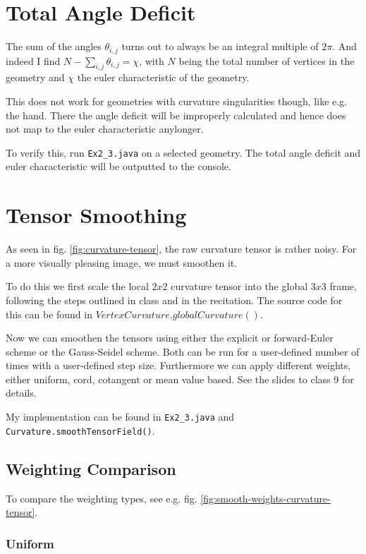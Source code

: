 \documentclass[a4paper,10pt,notitlepage]{scrreprt}
\begin{document}
\section{Total Angle Deficit}

The sum of the angles $\theta_{i,j}$ turns out to always be an integral multiple
of $2 \pi$. And indeed I find $N - \sum_{i,j} \theta_{i,j} = \chi$, with $N$
being the total number of vertices in the geometry and $\chi$ the euler
characteristic of the geometry.

This does not work for geometries with curvature singularities
though, like e.g. the hand. There the angle deficit will be
improperly calculated and hence does not map to the euler
characteristic anylonger.

To verify this, run \texttt{Ex2\_3.java} on a selected geometry. The total angle
deficit and euler characteristic will be outputted to the console.

\section{Tensor Smoothing}

As seen in fig. \ref{fig:curvature-tensor}, the raw curvature tensor is rather
noisy. For a more visually pleasing image, we must smoothen it.

To do this we first scale the local $2x2$ curvature tensor into the global
$3x3$ frame, following the steps outlined in class and in the recitation. The
source code for this can be found in $VertexCurvature.globalCurvature()$.

Now we can smoothen the tensors using either the explicit or forward-Euler
scheme or the Gauss-Seidel scheme. Both can be run for a user-defined number of
times with a user-defined step size. Furthermore we can apply different
weights, either uniform, cord, cotangent or mean value based. See the slides to
class 9 for details.

My implementation can be found in \texttt{Ex2\_3.java} and
\texttt{Curvature.smoothTensorField()}.

\subsection{Weighting Comparison}

To compare the weighting types, see e.g. fig.
\ref{fig:smooth-weights-curvature-tensor}.

\subsubsection{Uniform}
\end{document}
